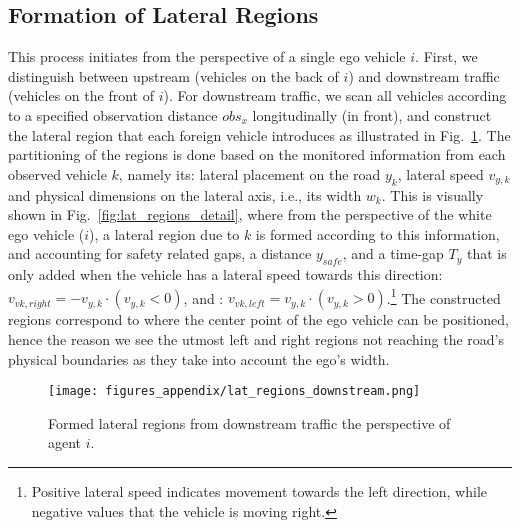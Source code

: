 \subsection{Formation of Lateral Regions}\label{subsec:lat_regions_form}
This process initiates from the perspective of a single ego vehicle $i$. First, we distinguish between upstream (vehicles on the back of $i$) and downstream traffic (vehicles on the front of $i$).
For downstream traffic, we scan all vehicles according to a specified observation distance ${obs}_x$ longitudinally (in front), and construct the lateral region that each foreign vehicle introduces as illustrated in Fig.~\ref{fig:lat_regions_downstream}.
The partitioning of the regions is done based on the monitored information from each observed vehicle $k$, namely its: lateral placement on the road $y_k$, lateral speed $v_{y,k}$ and physical dimensions on the lateral axis, i.e., its width $w_k$.
This is visually shown in Fig.~\ref{fig:lat_regions_detail}, where from the perspective of the white ego vehicle ($i$), a lateral region due to $k$ is formed according to this information, and accounting for safety related gaps, a distance $y_{safe}$, and a time-gap $T_y$ that is only added when the vehicle has a lateral speed towards this direction: $v_{vk,right}= -v_{y,k}\cdot (v_{y,k}<0)$, and : $v_{vk,left}= v_{y,k}\cdot (v_{y,k}>0)$.\footnote{Positive lateral speed indicates movement towards the left direction, while negative values that the vehicle is moving right.} 
The constructed regions correspond to where the center point of the ego vehicle can be positioned, hence the reason we see the utmost left and right regions not reaching the road's physical boundaries as they take into account the ego's width.



\begin{figure}[t]
    \centering
    \texttt{[image: figures\_appendix/lat\_regions\_downstream.png]}
    \caption{Formed lateral regions from downstream traffic the perspective of agent $i$.}
    \label{fig:lat_regions_downstream}
\end{figure}

